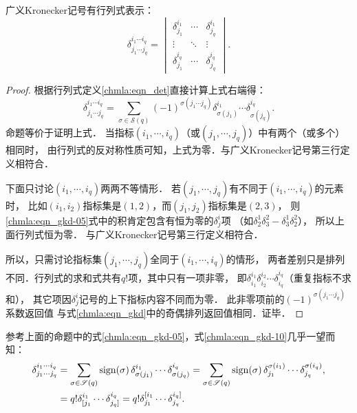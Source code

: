 \begin{proposition}
    广义Kronecker记号有行列式表示：
    \begin{equation}\label{chmla:eqn_kronecker-det}
        \delta_{j_1 \cdots j_q}^{i_1 \cdots i_q} =
        \begin{vmatrix}
            \delta_{j_1}^{i_1} & \cdots & \delta_{j_q}^{i_1} \\
            \vdots & \ddots   & \vdots \\
            \delta_{j_1}^{i_q} & \cdots & \delta_{j_q}^{i_q}
        \end{vmatrix} .
    \end{equation}
\end{proposition}
\begin{proof}
根据行列式定义\eqref{chmla:eqn_det}直接计算上式右端得：
\begin{equation}\label{chmla:eqn_gkd-05}
    \delta_{j_1 \cdots j_q}^{i_1 \cdots i_q} =
    \sum_{\sigma \in \mathscr{S}(q)} (-1)^{\sigma(j_1  \cdots j_q)}
    \delta^{i_1}_{\sigma(j_1)} \cdots \delta^{i_q}_{\sigma(j_q)}.
\end{equation}
命题等价于证明上式．
当指标$(i_1, \cdots, i_q)$（或$(j_1, \cdots, j_q)$）中有两个（或多个）相同时，
由行列式的反对称性质可知，上式为零．与广义Kronecker记号第三行定义相符合．

下面只讨论$(i_1, \cdots, i_q)$两两不等情形．
若$(j_1, \cdots, j_q)$有不同于$(i_1, \cdots, i_q)$的元素时，
比如$(i_1, i_2)$指标集是$(1,2)$，而$(j_1, j_2)$指标集是$(2, 3)$，
则\eqref{chmla:eqn_gkd-05}式中的积肯定包含有恒为零的$\delta^i_j$项
（如$\delta^1_2 \delta^2_3-\delta^1_3 \delta^2_2$），
所以上面行列式恒为零．
与广义Kronecker记号第三行定义相符合．

所以，只需讨论指标集$(j_1, \cdots, j_q)$全同于$(i_1, \cdots, i_q)$的情形，
两者差别只是排列不同．行列式的求和式共有$q!$项，其中只有一项非零，
即$\delta_{i_1}^{i_1} \delta_{i_2}^{i_2} \cdots \delta_{i_q}^{i_q}$（重复指标不求和），
其它项因$\delta^i_j$记号的上下指标内容不同而为零．
此非零项前的$(-1)^{\sigma(j_1  \cdots j_q)}$系数返回值
与式\eqref{chmla:eqn_gkd}中的奇偶排列返回值相同．证毕．
\end{proof}
参考上面的命题中的式\eqref{chmla:eqn_gkd-05}，式\eqref{chmla:eqn_gkd-10}几乎一望而知：
\begin{align}
    \delta^{i_1 \cdots i_q}_{j_1 \cdots j_q}
    &= \sum_{\sigma \in \mathscr{S}(q)} {\rm sign}(\sigma)\,
        \delta^{i_1}_{\sigma(j_1)} \cdots \delta^{i_q}_{\sigma(j_q)}
     = \sum_{\sigma \in \mathscr{S}(q)} {\rm sign}(\sigma)\,
        \delta^{\sigma(i_1)}_{j_1} \cdots \delta^{\sigma(i_q)}_{j_q}, \label{chmla:eqn_gkd-10} \\
    &= q! \delta^{i_1}_{\lbrack j_1} \cdots \delta^{i_q}_{j_q \rbrack}
    = q! \delta^{\lbrack i_1}_{j_1} \cdots \delta^{i_q \rbrack}_{j_q}.  \label{chmla:eqn_gkd-15}
\end{align}
